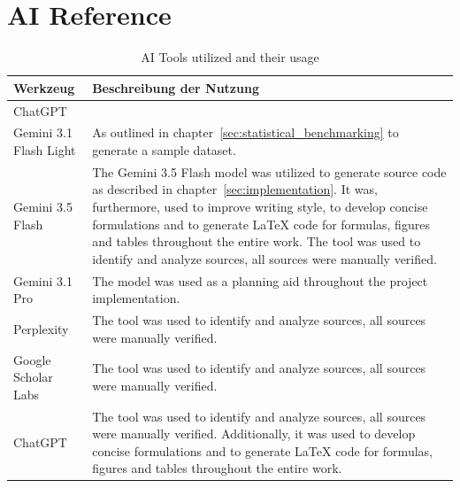 \section*{AI Reference}

\begin{table}[h]
    \centering
    \begin{tabular}{|>{\raggedright\arraybackslash}p{}|>{\raggedright\arraybackslash}p{}|}
    \hline
        \textbf{Werkzeug} & \textbf{Beschreibung der Nutzung} \\ \hline
        ChatGPT & \\ \hline
        Gemini 3.1 Flash Light & As outlined in chapter~\ref{sec:statistical_benchmarking} to generate a sample dataset. \\ \hline
        Gemini 3.5 Flash & The Gemini 3.5 Flash model was utilized to generate source code as described in chapter~\ref{sec:implementation}. It was, furthermore, used to improve writing style, to develop concise formulations and to generate LaTeX code for formulas, figures and tables throughout the entire work. The tool was used to identify and analyze sources, all sources were manually verified.\\ \hline
        Gemini 3.1 Pro & The model was used as a planning aid throughout the project implementation. \\ \hline
        Perplexity & The tool was used to identify and analyze sources, all sources were manually verified. \\ \hline
        Google Scholar Labs & The tool was used to identify and analyze sources, all sources were manually verified. \\ \hline
        ChatGPT & The tool was used to identify and analyze sources, all sources were manually verified. Additionally, it was used to develop concise formulations and to generate LaTeX code for formulas, figures and tables throughout the entire work. \\ \hline
    \end{tabular}
    \caption{AI Tools utilized and their usage}\label{tab:ki}
\end{table}